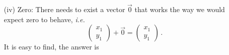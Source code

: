 {\begin{enumerate}
\begin{gather*}
\left(\begin{pmatrix}x_1\\x_2\end{pmatrix}+
\begin{pmatrix}y_1\\y_2\end{pmatrix}\right)+
\begin{pmatrix}z_1\\z_2\end{pmatrix}
=
\begin{pmatrix}x_1+y_1\\x_2+y_2\end{pmatrix}+
\begin{pmatrix}z_1\\z_2\end{pmatrix}
=
\begin{pmatrix}(x_1+y_1)+z_1\\(x_2+y_2)+z_2\end{pmatrix}
\\
=
\begin{pmatrix}x_1+(y_1+z_1)\\x_2+(y_2+z_2)\end{pmatrix}
=
\begin{pmatrix}x_1\\ y_1\end{pmatrix}+
\begin{pmatrix}y_1+z_1\\y_2+z_2\end{pmatrix}=
\begin{pmatrix}x_1\\x_2\end{pmatrix}+
\left(\begin{pmatrix}y_1\\y_2\end{pmatrix}+
\begin{pmatrix}z_1\\z_2\end{pmatrix}\right)\, .\end{gather*}
\item[(iv)] Zero: There needs to exist a vector $\vec 0$ that works the way we would 
expect zero to behave, {\it i.e.}
\[
\begin{pmatrix}x_1\\y_1\end{pmatrix}+\vec 0=\begin{pmatrix}x_1\\y_1\end{pmatrix}\, .
\]
It is easy to find, the answer is

\end{enumerate}}
